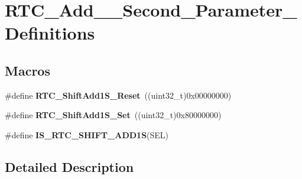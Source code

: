 \hypertarget{group___r_t_c___add__1___second___parameter___definitions}{\section{R\-T\-C\-\_\-\-Add\-\_\-\_\-\-Second\-\_\-\-Parameter\-\_\-\-Definitions}
\label{group___r_t_c___add__1___second___parameter___definitions}
}
\subsection*{Macros}
\begin{DoxyCompactItemize}
\item 
\hypertarget{group___r_t_c___add__1___second___parameter___definitions_ga8b202b701dc12f88a628345b40146f78}{\#define {\bfseries R\-T\-C\-\_\-\-Shift\-Add1\-S\-\_\-\-Reset}~((uint32\-\_\-t)0x00000000)}\label{group___r_t_c___add__1___second___parameter___definitions_ga8b202b701dc12f88a628345b40146f78}

\item 
\hypertarget{group___r_t_c___add__1___second___parameter___definitions_gafcf0fac6c5dafc3d1cd3c9ce6ec196be}{\#define {\bfseries R\-T\-C\-\_\-\-Shift\-Add1\-S\-\_\-\-Set}~((uint32\-\_\-t)0x80000000)}\label{group___r_t_c___add__1___second___parameter___definitions_gafcf0fac6c5dafc3d1cd3c9ce6ec196be}

\item 
\#define {\bfseries I\-S\-\_\-\-R\-T\-C\-\_\-\-S\-H\-I\-F\-T\-\_\-\-A\-D\-D1\-S}(S\-E\-L)
\end{DoxyCompactItemize}


\subsection{Detailed Description}


